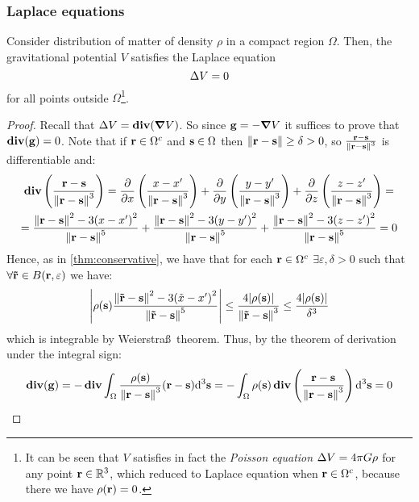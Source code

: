 \documentclass[../main.tex]{subfiles}
\begin{document}
\subsubsection{Laplace equations}
\begin{theorem}
  Consider distribution of matter of density $\rho$ in a compact region $\Omega$. Then, the gravitational potential $V$ satisfies the Laplace equation
  \begin{equation}
    \laplacian V = 0
  \end{equation}
  for all points outside $\Omega$\footnote{It can be seen that $V$ satisfies in fact the \emph{Poisson equation} $\laplacian V=4\pi G\rho$ for any point $\vf{r}\in\RR^3$, which reduced to Laplace equation when $\vf{r}\in\Omega^c$, because there we have $\rho(\vf{r})=0$.}.
\end{theorem}
\begin{proof}
  Recall that $\laplacian V=\div(\grad V)$. So since $\vf{g}=-\grad V$ it suffices to prove that $\div(\vf{g})=0$. Note that if $\vf{r}\in\Omega^c$ and $\vf{s}\in\Omega$ then $\norm{\vf{r}-\vf{s}}\geq\delta>0$, so $\frac{\vf{r}-\vf{s}}{\norm{\vf{r}-\vf{s}}^3}$ is differentiable and:
  \begin{multline*}
    \div\left(\frac{\vf{r}-\vf{s}}{\norm{\vf{r}-\vf{s}}^3}\right)=\pdv{}{x}\left(\frac{x-x'}{\norm{\vf{r}-\vf{s}}^3}\right)+\pdv{}{y}\left(\frac{y-y'}{\norm{\vf{r}-\vf{s}}^3}\right)+\pdv{}{z}\left(\frac{z-z'}{\norm{\vf{r}-\vf{s}}^3}\right)=\\
    =\frac{\norm{\vf{r}-\vf{s}}^2-3{(x-x')}^2}{\norm{\vf{r}-\vf{s}}^5}+\frac{\norm{\vf{r}-\vf{s}}^2-3{(y-y')}^2}{\norm{\vf{r}-\vf{s}}^5}+\frac{\norm{\vf{r}-\vf{s}}^2-3{(z-z')}^2}{\norm{\vf{r}-\vf{s}}^5} =0
  \end{multline*}
  Hence, as in \cref{thm:conservative}, we have that for each $\vf{r}\in\Omega^c$ $\exists\varepsilon,\delta>0$ such that $\forall \vf{\tilde{r}} \in B(\vf{r},\varepsilon)$ we have:
  $$
    \abs{\rho(\vf{s})\frac{\norm{\vf{\tilde{r}}-\vf{s}}^2-3{(\tilde{x}-x')}^2}{\norm{\vf{\tilde{r}}-\vf{s}}^5}}\leq \frac{4\abs{\rho(\vf{s})}}{\norm{\vf{\tilde{r}}-\vf{s}}^3}\leq \frac{4\abs{\rho(\vf{s})}}{\delta^3}
  $$
  which is integrable by Weierstra\ss\ theorem. Thus, by the theorem of derivation under the integral sign:
  \begin{equation}
    \div(\vf{g})=-\div\int_\Omega\frac{\rho(\vf{s})}{\norm{\vf{r}-\vf{s}}^3}(\vf{r}-\vf{s})\dd^3{\vf{s}}=-\int_\Omega\rho(\vf{s})\div\left(\frac{\vf{r}-\vf{s}}{\norm{\vf{r}-\vf{s}}^3}\right)\dd^3{\vf{s}}=0
  \end{equation}
\end{proof}
\end{document}
